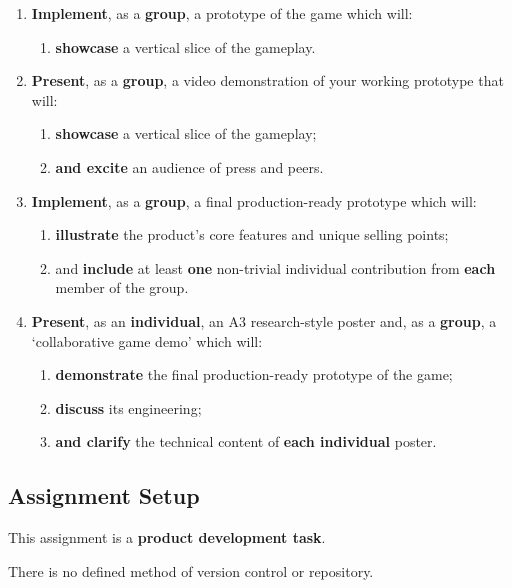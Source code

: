 \documentclass{../../fal_assignment}
\begin{document}
\begin{enumerate}[label=(\Alph*)]
    \item \textbf{Implement}, as a \textbf{group}, a prototype of the game which will:
    	\begin{enumerate}[label=\roman*.]
    		\item \textbf{showcase} a vertical slice of the gameplay.
	\end{enumerate}
    \item \textbf{Present}, as a \textbf{group}, a video demonstration of your working prototype that will:
    	\begin{enumerate}[label=\roman*.]
    		\item \textbf{showcase} a vertical slice of the gameplay;
    		\item \textbf{and excite} an audience of press and peers.
	\end{enumerate}
    \item \textbf{Implement}, as a \textbf{group}, a final production-ready prototype which will:
    	\begin{enumerate}[label=\roman*.]
    		\item \textbf{illustrate} the product's core features and unique selling points;
    		\item and \textbf{include} at least \textbf{one} non-trivial individual contribution from \textbf{each} member of the group.
	\end{enumerate}
    \item \textbf{Present}, as an \textbf{individual}, an A3 research-style poster and, as a \textbf{group}, a `collaborative game demo' which will:
    	\begin{enumerate}[label=\roman*.]
    		\item \textbf{demonstrate} the final production-ready prototype of the game;
    		\item \textbf{discuss} its engineering;
    		 \item \textbf{and clarify} the technical content of \textbf{each individual} poster.
	\end{enumerate}
\end{enumerate}
  
\subsection*{Assignment Setup}

This assignment is a \textbf{product development task}.

There is no defined method of version control or repository.
\end{document}
